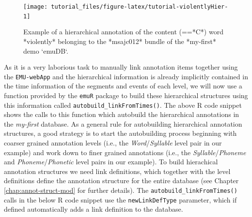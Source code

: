 \documentclass[]{book}
\begin{document}
\begin{figure}

{\centering \texttt{[image: tutorial\_files/figure-latex/tutorial-violentlyHier-1]} 

}

\caption{Example of a hierarchical annotation of the content (==*C*) word *violently* belonging to the *msajc012* bundle of the *my-first* demo `emuDB`.}\label{fig:tutorial-violentlyHier}
\end{figure}

As it is a very laborious task to manually link annotation items together using the \texttt{EMU-webApp} and the hierarchical information is already implicitly contained in the time information of the segments and events of each level, we will now use a function provided by the \texttt{emuR} package to build these hierarchical structures using this information called \texttt{autobuild\_linkFromTimes()}. The above R code snippet shows the calls to this function which autobuild the hierarchical annotations in the \emph{my-first} database. As a general rule for autobuilding hierarchical annotation structures, a good strategy is to start the autobuilding process beginning with coarser grained annotation levels (i.e., the \emph{Word}/\emph{Syllable} level pair in our example) and work down to finer grained annotations (i.e., the \emph{Syllable}/\emph{Phoneme} and \emph{Phoneme}/\emph{Phonetic} level pairs in our example). To build hierachical annotation structures we need link definitions, which together with the level definitions define the annotation structure for the entire database (see Chapter \ref{chap:annot-struct-mod} for further details). The \texttt{autobuild\_linkFromTimes()} calls in the below R code snippet use the \texttt{newLinkDefType} parameter, which if defined automatically adds a link definition to the database.
\end{document}
